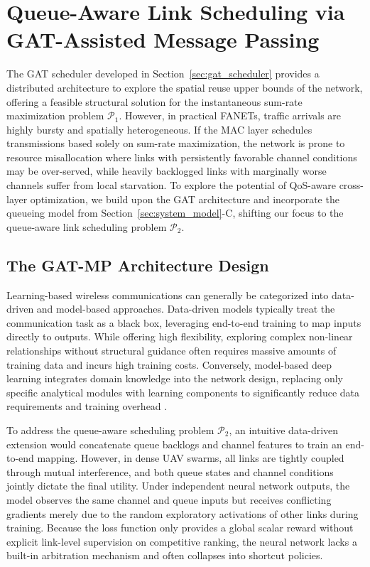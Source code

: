 \documentclass[letterpaper,journal]{IEEEtran}
\begin{document}
\section{Queue-Aware Link Scheduling via GAT-Assisted Message Passing}
\label{sec:marginal_mp}

The GAT scheduler developed in Section~\ref{sec:gat_scheduler} provides a distributed architecture to explore the spatial reuse upper bounds of the network, offering a feasible structural solution for the instantaneous sum-rate maximization problem $\mathcal{P}_1$. However, in practical FANETs, traffic arrivals are highly bursty and spatially heterogeneous. If the MAC layer schedules transmissions based solely on sum-rate maximization, the network is prone to resource misallocation where links with persistently favorable channel conditions may be over-served, while heavily backlogged links with marginally worse channels suffer from local starvation. To explore the potential of QoS-aware cross-layer optimization, we build upon the GAT architecture and incorporate the queueing model from Section~\ref{sec:system_model}-C, shifting our focus to the queue-aware link scheduling problem $\mathcal{P}_2$.

\subsection{The GAT-MP Architecture Design}
\label{ssec:gat_mp_architecture}

Learning-based wireless communications can generally be categorized into data-driven and model-based approaches\cite{ModelBasedDL}. Data-driven models typically treat the communication task as a black box, leveraging end-to-end training to map inputs directly to outputs. While offering high flexibility, exploring complex non-linear relationships without structural guidance often requires massive amounts of training data and incurs high training costs. Conversely, model-based deep learning integrates domain knowledge into the network design, replacing only specific analytical modules with learning components to significantly reduce data requirements and training overhead \cite{PMAPNet}.

To address the queue-aware scheduling problem $\mathcal{P}_2$, an intuitive data-driven extension would concatenate queue backlogs and channel features to train an end-to-end mapping. However, in dense UAV swarms, all links are tightly coupled through mutual interference, and both queue states and channel conditions jointly dictate the final utility. Under independent neural network outputs, the model observes the same channel and queue inputs but receives conflicting gradients merely due to the random exploratory activations of other links during training. Because the loss function only provides a global scalar reward without explicit link-level supervision on competitive ranking, the neural network lacks a built-in arbitration mechanism and often collapses into shortcut policies.
\end{document}
